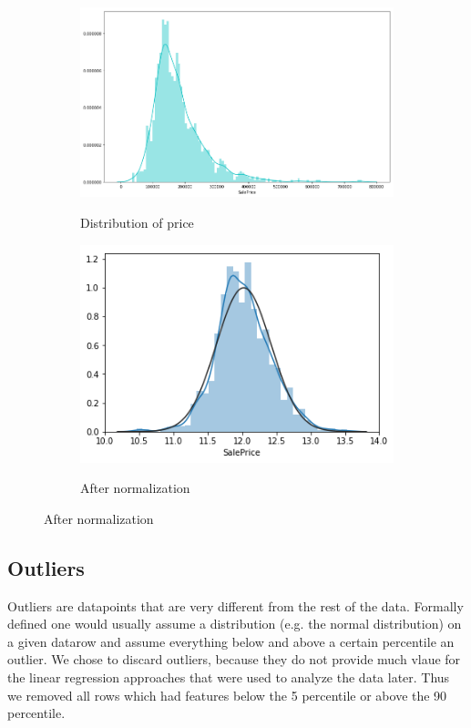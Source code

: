 \begin{figure}[h!]
  \centering
  \begin{subfigure}[b]{0.4\linewidth}
    \includegraphics[width=\linewidth]{images/price_distribution.png}
    \label{fig:dist-1}
    \caption{Distribution of price}
  \end{subfigure}
  \begin{subfigure}[b]{0.4\linewidth}
    \includegraphics[width=\linewidth]{images/price_normalize_distribution.png}
    \label{fig:dist-2}
    \caption{After normalization}
  \end{subfigure}
\end{figure}

\subsection{Outliers}
Outliers are datapoints that are very different from the rest of the data. Formally defined one would usually assume a distribution (e.g. the normal distribution) on a given datarow and assume everything below and above a certain percentile an outlier.\newline
 We chose to discard outliers, because they do not provide much vlaue for the linear regression approaches that were used to analyze the data later. Thus we removed all rows which had features below the 5 percentile or above the 90 percentile.\newline
